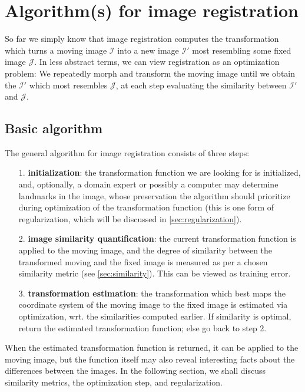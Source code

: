 \newcommand{\I}{\mathcal I}
\newcommand{\J}{\mathcal J}

\section{Algorithm(s) for image registration}

So far we simply know that image registration computes the transformation which
turns a moving image $\I$ into a new image $\I'$ most resembling some fixed
image $\J$. In less abstract terms, we can view registration as an optimization
problem: We repeatedly morph and transform the moving image until we obtain the
$\I'$ which most resembles $\J$, at each step evaluating the similarity between
$\I'$ and $\J$.

\subsection{Basic algorithm}

The general algorithm for image registration consists of three steps:

\begin{enumerate}
  \item[1.] \textbf{initialization}: the transformation function we are looking
    for is initialized, and, optionally, a domain expert or possibly a computer
    may determine landmarks in the image, whose preservation the algorithm
    should prioritize during optimization of the transformation function
    (this is one form of regularization, which will be discussed in
    \cref{sec:regularization}).

  \item[2.] \textbf{image similarity quantification}: the current transformation
    function is applied to the moving image, and the degree of similarity
    between the transformed moving and the fixed image is measured as per a
    chosen similarity metric (see \cref{sec:similarity}).
    This can be viewed as training error.

  \item[3.] \textbf{transformation estimation}: the transformation which best maps
    the coordinate system of the moving image to the fixed image is estimated
    via optimization, wrt. the similarities computed earlier. If similarity
    is optimal, return the estimated transformation function; else go back to
    step 2.
\end{enumerate}

When the estimated transformation function is returned, it can be applied to the
moving image, but the function itself may also reveal interesting facts about
the differences between the images. In the following section, we shall discuss
similarity metrics, the optimization step, and regularization.

